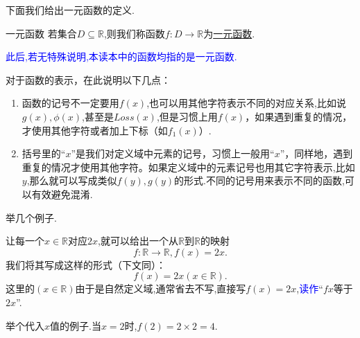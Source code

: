 \documentclass[lang=cn,math=cm,chinesefont=nofont,11pt,scheme=chinese,twocol]{elegantbook}
\begin{document}
下面我们给出一元函数的定义.

\begin{definition}{一元函数}
  若集合$D\subseteq \mathbb{R}$,则我们称函数$f:D\rightarrow\mathbb{R}$为\underline{一元函数}.
\end{definition}

\textcolor{blue}{此后,若无特殊说明,本读本中的函数均指的是一元函数.}

对于函数的表示，在此说明以下几点：
\begin{enumerate}
  \item 函数的记号不一定要用$f(x)$,也可以用其他字符表示不同的对应关系,比如说$g(x),\phi (x)$,甚至是$Loss(x)$,但是习惯上用$f(x)$，如果遇到重复的情况，才使用其他字符或者加上下标（如$f_1(x)$）.
  \item 括号里的“$x$”是我们对定义域中元素的记号，习惯上一般用“$x$”，同样地，遇到重复的情况才使用其他字符。如果定义域中的元素记号也用其它字符表示,比如$y$,那么就可以写成类似$f(y),g(y)$的形式.不同的记号用来表示不同的函数,可以有效避免混淆.
\end{enumerate}

举几个例子.

\begin{example}\label{MapExample2}
  让每一个$x\in\mathbb{R}$对应$2x$,就可以给出一个从$\mathbb{R}$到$\mathbb{R}$的映射$$f:\mathbb{R}\rightarrow\mathbb{R},f(x)=2x.$$我们将其写成这样的形式（下文同）：$$f(x)=2x(x\in\mathbb{R}).$$这里的$(x\in\mathbb{R})$由于是自然定义域,通常省去不写,直接写$f(x)=2x$,\textcolor{blue}{读作}“$fx$等于$2x$”.

  举个代入$x$值的例子.当$x=2$时,$f(2)=2\times 2=4$.
\end{example}
\end{document}
